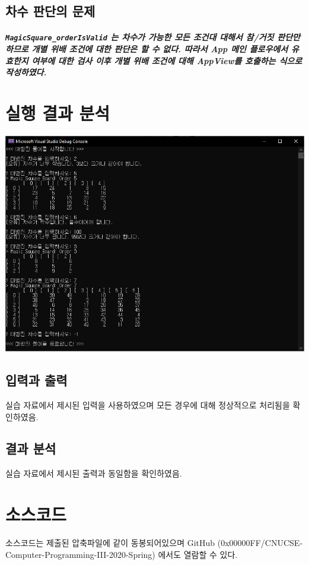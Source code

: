 \documentclass[UTF8]{report}
\begin{document}
        \section{차수 판단의 문제}
            \paragraph{%
                \normalfont \texttt{MagicSquare\_orderIsValid} 는 차수가 가능한 모든 조건대 대해서 참/거짓 판단만 하므로 개별 위배 조건에 대한 판단은 할 수 없다. 따라서 App 메인 플로우에서 유효한지 여부에 대한 검사 이후 개별 위배 조건에 대해 AppView를 호출하는 식으로 작성하였다.
            }
        
        \chapter{실행 결과 분석}
            \includegraphics[width=\textwidth]{test_result.png}
            \section{입력과 출력}
                실습 자료에서 제시된 입력을 사용하였으며 모든 경우에 대해 정상적으로 처리됨을 확인하였음.
            \section{결과 분석}
                실습 자료에서 제시된 출력과 동일함을 확인하였음.
    
        \chapter{소스코드}
            소스코드는 제출된 압축파일에 같이 동봉되어있으며 GitHub (0x00000FF/CNUCSE-Computer-Programming-III-2020-Spring) 에서도 열람할 수 있다.
\end{document}

